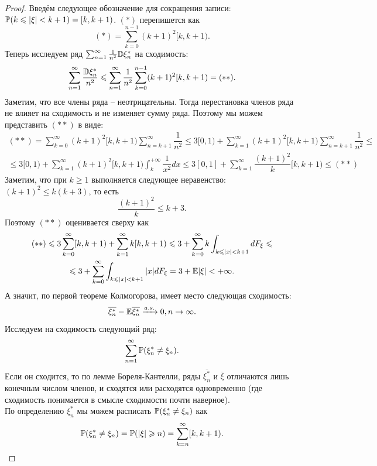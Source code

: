 \begin{proof}
    Введём следующее обозначение для сокращения записи: $\P(k \leq |\xi| < k + 1) = [k, k + 1)$. $(*)$ перепишется как
    \[
        (*) = \sum\limits_{k = 0}^{n - 1}(k + 1)^2[k, k + 1).
    \]
    Теперь исследуем ряд $\sum_{n = 1}^{\infty} \frac{1}{n^2}\D\xi_n^*$ на сходимость:
    \[
        \sum\limits_{n = 1}^{\infty} \dfrac{\D \xi_n^*}{n^2} \leq \sum\limits_{n = 1}^{\infty} \dfrac{1}{n^2}\sum\limits_{k = 0}^{n - 1}(k + 1)^2[k, k + 1) = (**).
    \]
    Заметим, что все члены ряда -- неотрицательны. Тогда перестановка членов ряда не влияет на сходимость и не изменяет сумму ряда. Поэтому мы можем представить $(**)$ в виде:
    \begin{multline*}
        (**) = \sum\limits_{k = 0}^{\infty} (k + 1)^2 [k, k + 1) \sum\limits_{n = k + 1}^{\infty} \dfrac{1}{n^2} \leq 3[0, 1) + \sum\limits_{k = 1}^{\infty}(k + 1)^2[k, k + 1) \sum\limits_{n = k + 1}^{\infty}\dfrac{1}{n^2} \leq \\ \leq 3[0, 1) + \sum\limits_{k = 1}^{\infty}(k + 1)^2 [k, k + 1)\int_k^{+\infty}\dfrac{1}{x^2}dx \leq 3[0, 1] + \sum\limits_{k = 1}^{\infty} \dfrac{(k + 1)^2}{k}[k, k + 1) \leq (**)
    \end{multline*}
    Заметим, что при $k \geq 1$ выполняется следующее неравенство: $(k + 1)^2 \leq k(k + 3)$, то есть 
    \[
        \dfrac{(k + 1)^2}{k} \leq k + 3.
    \]
    Поэтому $(**)$ оценивается сверху как 
    \begin{multline*}
        (**) \leq 3\sum\limits_{k = 0}^{\infty}[k, k + 1) + \sum\limits_{k = 1}^{\infty} k [k, k + 1) \leq  3 + \sum\limits_{k = 0}^{\infty}k \int_{k \leq |x| < k + 1}dF_{\xi} \leq \\ \leq 3 + \sum\limits_{k = 0}^{\infty}\int_{k \leq |x| < k + 1} |x|dF_{\xi} = 3 + \Ex|\xi| < +\infty.
    \end{multline*}
    А значит, по первой теореме Колмогорова, имеет место следующая сходимость: \[\overline{\xi_n^*} - \Ex \overline{\xi_n^*} \xrightarrow{a.s.} 0, n \ra \infty.\]
    Исследуем на сходимость следующий ряд:
    \[
        \sum\limits_{n = 1}^{\infty} \P(\xi_n^* \neq \xi_n).
    \]
    Если он сходится, то по лемме Бореля-Кантелли, ряды $\overline{\xi_n^*}$ и $\overline{\xi}$ отличаются лишь конечным числом членов, и сходятся или расходятся одновременно (где сходимость понимается в смысле сходимости почти наверное). \\
    По определению $\xi_n^*$ мы можем расписать $\P(\xi_n^* \neq \xi_n)$ как 
    \[
        \P(\xi_n^* \neq \xi_n) = \P(|\xi| \geq n) = \sum\limits_{k = n}^{\infty}[k, k + 1).
    \]

\end{proof}
